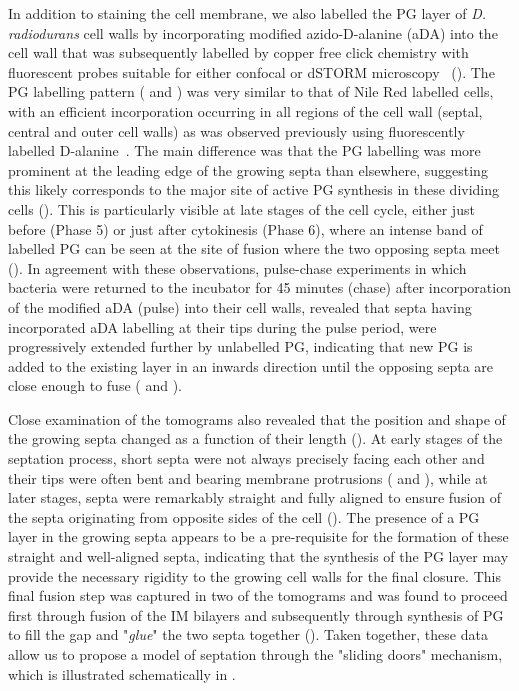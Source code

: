 In addition to staining the cell membrane, we also labelled the PG layer of \textit{D. radiodurans} cell walls by incorporating modified azido-D-alanine (aDA) into the cell wall that was subsequently labelled by copper free click chemistry with fluorescent probes suitable for either confocal or dSTORM microscopy~\cite{trouveNanoscaleDynamicsPeptidoglycan2021,trouveMetabolicBiorthogonalLabeling2021} ().
The PG labelling pattern ( and ) was very similar to that of Nile Red labelled cells, with an efficient incorporation occurring in all regions of the cell wall (septal, central and outer cell walls) as was observed previously using fluorescently labelled D-alanine~\cite{flochCellMorphologyNucleoid2019}.
The main difference was that the PG labelling was more prominent at the leading edge of the growing septa than elsewhere, suggesting this likely corresponds to the major site of active PG synthesis in these dividing cells ().
This is particularly visible at late stages of the cell cycle, either just before (Phase 5) or just after cytokinesis (Phase 6), where an intense band of labelled PG can be seen at the site of fusion where the two opposing septa meet ().
In agreement with these observations, pulse-chase experiments in which bacteria were returned to the incubator for 45 minutes (chase) after incorporation of the modified aDA (pulse) into their cell walls, revealed that septa having incorporated aDA labelling at their tips during the pulse period, were progressively extended further by unlabelled PG, indicating that new PG is added to the existing layer in an inwards direction until the opposing septa are close enough to fuse ( and ).

Close examination of the tomograms also revealed that the position and shape of the growing septa changed as a function of their length ().
At early stages of the septation process, short septa were not always precisely facing each other and their tips were often bent and bearing membrane protrusions ( and ), while at later stages, septa were remarkably straight and fully aligned to ensure fusion of the septa originating from opposite sides of the cell ().
The presence of a PG layer in the growing septa appears to be a pre-requisite for the formation of these straight and well-aligned septa, indicating that the synthesis of the PG layer may provide the necessary rigidity to the growing cell walls for the final closure.
This final fusion step was captured in two of the tomograms and was found to proceed first through fusion of the IM bilayers and subsequently through synthesis of PG to fill the gap and "\textit{glue}" the two septa together ().
Taken together, these data allow us to propose a model of septation through the "sliding doors" mechanism, which is illustrated schematically in .

